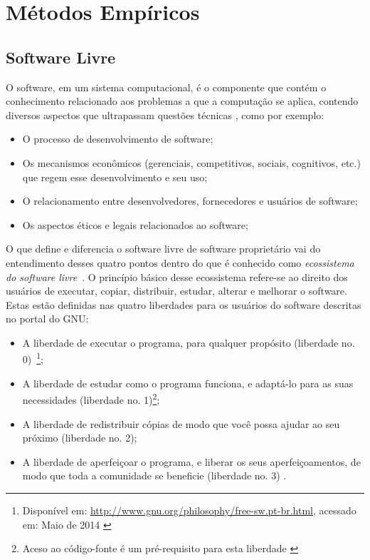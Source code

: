 \chapter{Métodos Empíricos}
\label{cap-met-emp}


\section{Software Livre}
\label{sec-swl}

O software, em um sistema computacional, é o componente que contém o conhecimento relacionado aos problemas a que a computação se aplica, contendo diversos aspectos que ultrapassam questões técnicas \cite{meirelles2013metrics}, como por exemplo: 

\begin{itemize}
\item O processo de desenvolvimento de software;
\item Os mecanismos econômicos (gerenciais, competitivos, sociais, cognitivos, etc.) que regem esse desenvolvimento e seu uso;
\item O relacionamento entre desenvolvedores, fornecedores e usuários de software;
\item Os aspectos éticos e legais relacionados ao software;
\end{itemize}

O que define e diferencia o software livre de software proprietário vai do entendimento desses quatro pontos dentro do que é conhecido como \textit{ecossistema do software livre}~\cite{meirelles2013}.
O princípio básico desse ecossistema refere-se ao direito dos usuários de executar, copiar, distribuir, estudar, alterar e melhorar o software. Estas estão definidas nas quatro liberdades para os usuários do software descritas no portal do GNU:

\begin{itemize}
\item A liberdade de executar o programa, para qualquer propósito (liberdade no. 0)~\footnote{Disponível em: \url{http://www.gnu.org/philosophy/free-sw.pt-br.html}, acessado em: Maio de 2014 \label{ft:gnu-ref}};
\item A liberdade de estudar como o programa funciona, e adaptá-lo para as suas necessidades (liberdade no. 1)\footnote{Aceso ao código-fonte é um pré-requisito para esta liberdade \label{ft:acessocodfonte}};
\item A liberdade de redistribuir cópias de modo que você possa ajudar ao seu próximo (liberdade no. 2);
\item A liberdade de aperfeiçoar o programa, e liberar os seus aperfeiçoamentos, de modo que toda a comunidade se beneficie (liberdade no. 3) .
\end{itemize}

